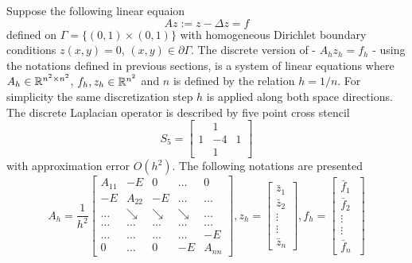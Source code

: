 \documentclass[11pt,a4paper,twoside]{article}
\begin{document}
Suppose the following linear equaion
\begin{equation}\label{FPeq}
Az:=z-\Delta z = f
\end{equation}
defined on $\Gamma = \{ (0,1) \times (0,1) \}$ with homogeneous Dirichlet boundary conditions $z(x,y) = 0$, $(x,y) \in \partial \Gamma$. The discrete version of  - $A_h z_h = f_h$ - using the notations defined in previous sections, is a system of linear equations where $A_h \in \mathbb{R}^{n^2 \times n^2}$, $f_h, z_h \in \mathbb{R}^{n^2}$ and $n$ is defined by the relation $h=1/n$. For simplicity the same discretization step $h$ is applied along both space directions.
The discrete Laplacian operator is described by five point cross stencil
\[
S_5 = 
\begin{bmatrix}
            &  1  &  \\
    1     &  -4    & 1\\
            &  1  &  
\end{bmatrix}
\]
with approximation error $O(h^2)$. The following notations are presented
\[
A_h = \frac{1}{h^2}
\begin{bmatrix}
    A_{11}       & -E          &  0              & \dots & 0 \\
    -E               & A_{22}  & -E              & \dots & \dots  \\
      \dots         & \searrow     & \searrow  & \searrow  & \dots  \\
      \dots         & \dots     & \dots         & \dots   &    \dots  \\
      \dots         & \dots    & \dots         & \dots & -E  \\
     0                 & \dots   &  0               & -E    & A_{nn}
\end{bmatrix}
,
z_h = 
\begin{bmatrix}
    \bar z_{1} \\
    \bar z_{2}  \\
    \vdots  \\
    \vdots  \\
    \bar z_{n}
\end{bmatrix}
,
f_h = 
\begin{bmatrix}
    \bar f_{1} \\
    \bar f_{2}  \\
    \vdots  \\
    \vdots  \\
    \bar f_{n}\
\end{bmatrix}
\]
\end{document}
